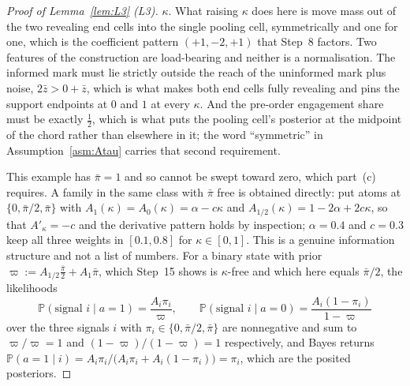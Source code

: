 \documentclass[11pt]{article}
\newcommand{\Prb}{\mathbb{P}}
\newcommand{\Akap}{A'_{\kappa}}
\begin{document}
\begin{proof}[Proof of Lemma~\ref{lem:L3} (L3)]
$\kappa$. What raising $\kappa$ does here is move mass out of the two revealing end cells into the
single pooling cell, symmetrically and one for one, which is the coefficient pattern $(+1,-2,+1)$
that Step~8 factors. Two features of the construction are load-bearing and neither is a
normalisation. The informed mark must lie strictly outside the reach of the uninformed mark plus
noise, $2\bar z > 0+\bar z$, which is what makes both end cells fully revealing and pins the support
endpoints at $0$ and $1$ at every $\kappa$. And the pre-order engagement share must be exactly
$\tfrac12$, which is what puts the pooling cell's posterior at the midpoint of the chord rather than
elsewhere in it; the word ``symmetric'' in Assumption~\ref{asm:Atau} carries that second requirement.

This example has $\bar\pi = 1$ and so cannot be swept toward zero, which part~(c) requires. A family
in the same class with $\bar\pi$ free is obtained directly: put atoms at $\{0,\bar\pi/2,\bar\pi\}$
with $A_1(\kappa) = A_0(\kappa) = \alpha-c\kappa$ and $A_{1/2}(\kappa) = 1-2\alpha+2c\kappa$, so that
$\Akap = -c$ and the derivative pattern holds by inspection; $\alpha = 0.4$ and $c = 0.3$ keep all
three weights in $[0.1,0.8]$ for $\kappa \in [0,1]$. This is a genuine information structure and not
a list of numbers. For a binary state with prior
$\varpi := A_{1/2}\tfrac{\bar\pi}{2}+A_1\bar\pi$, which Step~15 shows is $\kappa$-free and which here
equals $\bar\pi/2$, the likelihoods
\begin{equation}
\label{eq:L3-likelihood}
\Prb(\text{signal } i \mid a=1) = \frac{A_i\pi_i}{\varpi},
\qquad
\Prb(\text{signal } i \mid a=0) = \frac{A_i(1-\pi_i)}{1-\varpi}
\end{equation}
over the three signals $i$ with $\pi_i \in \{0,\bar\pi/2,\bar\pi\}$ are nonnegative and sum to
$\varpi/\varpi = 1$ and $(1-\varpi)/(1-\varpi) = 1$ respectively, and Bayes returns
$\Prb(a=1 \mid i) = A_i\pi_i/\bigl(A_i\pi_i+A_i(1-\pi_i)\bigr) = \pi_i$, which are the posited
posteriors.


\end{proof}
\end{document}
